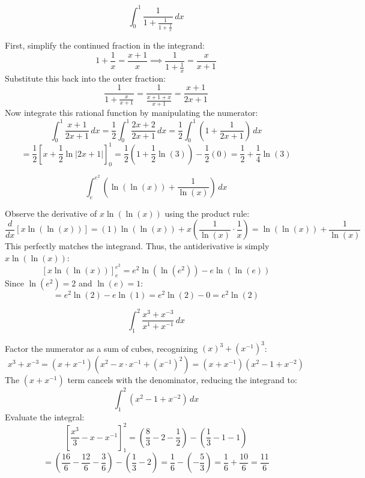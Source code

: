 \begin{questions}
    \question \[ \int_{0}^{1}\frac{1}{1+\frac{1}{1+\frac{1}{x}}} \,dx \]
    \begin{solution}
        First, simplify the continued fraction in the integrand:
        \[ 1 + \frac{1}{x} = \frac{x+1}{x} \implies \frac{1}{1+\frac{1}{x}} = \frac{x}{x+1} \]
        Substitute this back into the outer fraction:
        \[ \frac{1}{1 + \frac{x}{x+1}} = \frac{1}{\frac{x+1+x}{x+1}} = \frac{x+1}{2x+1} \]
        Now integrate this rational function by manipulating the numerator:
        \[ \int_{0}^{1} \frac{x+1}{2x+1} \,dx = \frac{1}{2} \int_{0}^{1} \frac{2x+2}{2x+1} \,dx = \frac{1}{2} \int_{0}^{1} \left( 1 + \frac{1}{2x+1} \right) \,dx \]
        \[ = \frac{1}{2} \left[ x + \frac{1}{2}\ln|2x+1| \right]_0^1 = \frac{1}{2} \left( 1 + \frac{1}{2}\ln(3) \right) - \frac{1}{2}(0) = \frac{1}{2} + \frac{1}{4}\ln(3) \]
    \end{solution}

    \question \[ \int_{e}^{e^{2}}\left(\ln(\ln(x))+\frac{1}{\ln(x)}\right) \,dx \]
    \begin{solution}
        Observe the derivative of $x\ln(\ln(x))$ using the product rule:
        \[ \frac{d}{dx} [x\ln(\ln(x))] = (1)\ln(\ln(x)) + x \left( \frac{1}{\ln(x)} \cdot \frac{1}{x} \right) = \ln(\ln(x)) + \frac{1}{\ln(x)} \]
        This perfectly matches the integrand. Thus, the antiderivative is simply $x\ln(\ln(x))$:
        \[ \left[ x\ln(\ln(x)) \right]_e^{e^2} = e^2\ln(\ln(e^2)) - e\ln(\ln(e)) \]
        Since $\ln(e^2) = 2$ and $\ln(e) = 1$:
        \[ = e^2\ln(2) - e\ln(1) = e^2\ln(2) - 0 = e^2\ln(2) \]
    \end{solution}

    \question \[ \int_{1}^{2}\frac{x^{3}+x^{-3}}{x^{1}+x^{-1}} \,dx \]
    \begin{solution}
        Factor the numerator as a sum of cubes, recognizing $(x)^3 + (x^{-1})^3$:
        \[ x^3 + x^{-3} = (x + x^{-1})(x^2 - x \cdot x^{-1} + (x^{-1})^2) = (x + x^{-1})(x^2 - 1 + x^{-2}) \]
        The $(x + x^{-1})$ term cancels with the denominator, reducing the integrand to:
        \[ \int_{1}^{2} (x^2 - 1 + x^{-2}) \,dx \]
        Evaluate the integral:
        \[ \left[ \frac{x^3}{3} - x - x^{-1} \right]_1^2 = \left( \frac{8}{3} - 2 - \frac{1}{2} \right) - \left( \frac{1}{3} - 1 - 1 \right) \]
        \[ = \left( \frac{16}{6} - \frac{12}{6} - \frac{3}{6} \right) - \left( \frac{1}{3} - 2 \right) = \frac{1}{6} - \left(-\frac{5}{3}\right) = \frac{1}{6} + \frac{10}{6} = \frac{11}{6} \]
    \end{solution}


\end{questions}
